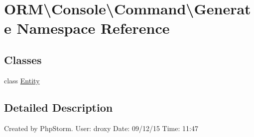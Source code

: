 \hypertarget{namespaceORM_1_1Console_1_1Command_1_1Generate}{}\section{O\+RM\textbackslash{}Console\textbackslash{}Command\textbackslash{}Generate Namespace Reference}
\label{namespaceORM_1_1Console_1_1Command_1_1Generate}
\subsection*{Classes}
\begin{DoxyCompactItemize}
\item 
class \hyperlink{classORM_1_1Console_1_1Command_1_1Generate_1_1Entity}{Entity}
\end{DoxyCompactItemize}


\subsection{Detailed Description}
Created by Php\+Storm. User\+: droxy Date\+: 09/12/15 Time\+: 11\+:47 